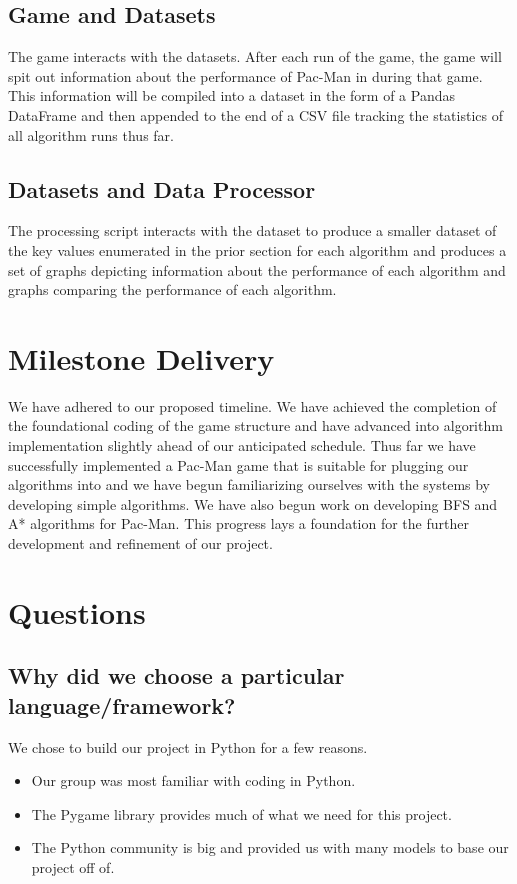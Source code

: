 \documentclass[12pt]{article}
\begin{document}
    \subsection*{Game and Datasets}
      The game interacts with the datasets. After each run of the game, the game will spit out information about the performance of Pac-Man in during that game. This information will be compiled into a dataset in the form of a Pandas DataFrame and then appended to the end of a CSV file tracking the statistics of all algorithm runs thus far.
    \subsection*{Datasets and Data Processor}
      The processing script interacts with the dataset to produce a smaller dataset of the key values enumerated in the prior section for each algorithm and produces a set of graphs depicting information about the performance of each algorithm and graphs comparing the performance of each algorithm.
  \section*{Milestone Delivery}
    We have adhered to our proposed timeline. We have achieved the completion of the foundational coding of the game structure and have advanced into algorithm implementation slightly ahead of our anticipated schedule. Thus far we have successfully implemented a Pac-Man game that is suitable for plugging our algorithms into and we have begun familiarizing ourselves with the systems by developing simple algorithms. We have also begun work on developing BFS and A* algorithms for Pac-Man. This progress lays a foundation for the further development and refinement of our project.
  \section*{Questions}
    \subsection*{Why did we choose a particular language/framework?}
      We chose to build our project in Python for a few reasons.
      \begin{itemize}
        \itemsep0pt
        \item Our group was most familiar with coding in Python.
        \item The Pygame library provides much of what we need for this project.
        \item The Python community is big and provided us with many models to base our project off of.
      \end{itemize}
    
\end{document}

